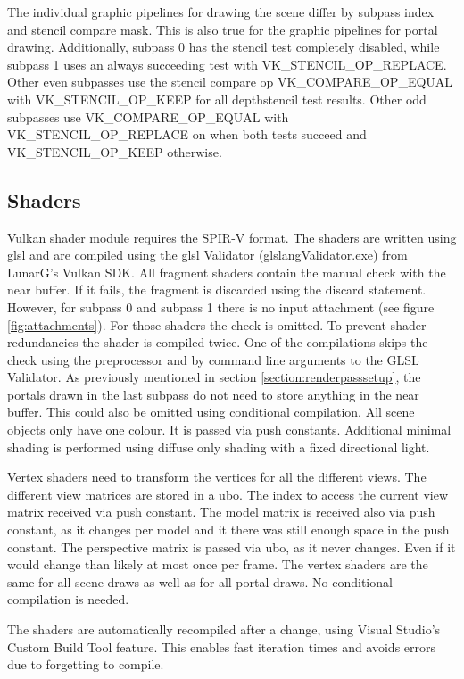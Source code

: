 The individual graphic pipelines for drawing the scene differ by subpass index and stencil compare mask. This is also true for the graphic pipelines for portal drawing. Additionally, subpass 0 has the stencil test completely disabled, while subpass 1 uses an always succeeding test with VK\_STENCIL\_OP\_REPLACE. Other even subpasses use the stencil compare op VK\_COMPARE\_OP\_EQUAL with VK\_STENCIL\_OP\_KEEP for all depthstencil test results. Other odd subpasses use VK\_COMPARE\_OP\_EQUAL with VK\_STENCIL\_OP\_REPLACE on when both tests succeed and  VK\_STENCIL\_OP\_KEEP otherwise.

\subsection{Shaders}
Vulkan shader module requires the SPIR-V format. The shaders are written using \gls{glsl} and are compiled using the \gls{glsl} Validator (glslangValidator.exe) from LunarG's Vulkan SDK. All fragment shaders contain the manual check with the near buffer. If it fails, the fragment is discarded using the discard statement. However, for subpass 0 and subpass 1 there is no input attachment (see figure \ref{fig:attachments}). For those shaders the check is omitted. To prevent shader redundancies the shader is compiled twice. One of the compilations skips the check using the preprocessor and by command line arguments to the GLSL Validator. As previously mentioned in section \ref{section:renderpasssetup}, the portals drawn in the last subpass do not need to store anything in the near buffer. This could also be omitted using conditional compilation. All scene objects only have one colour. It is passed via push constants. Additional minimal shading is performed using diffuse only shading with a fixed directional light.

Vertex shaders need to transform the vertices for all the different views. The different view matrices are stored in a \gls{ubo}. The index to access the current view matrix received via push constant. The model matrix is received also via push constant, as it changes per model and it there was still enough space in the push constant. The perspective matrix is passed via \gls{ubo}, as it never changes. Even if it would change than likely at most once per frame. The vertex shaders are the same for all scene draws as well as for all portal draws. No conditional compilation is needed.


The shaders are automatically recompiled after a change, using Visual Studio's Custom Build Tool feature. This enables fast iteration times and avoids errors due to forgetting to compile.


